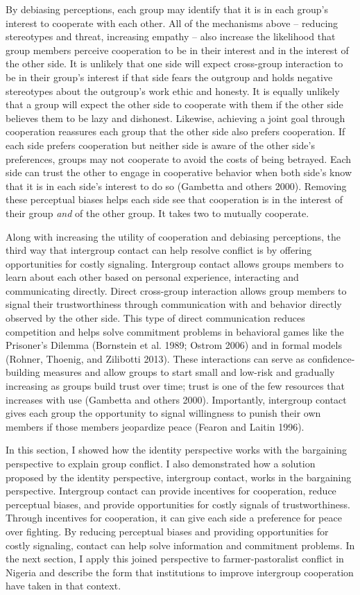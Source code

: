 \documentclass[11pt]{article}
\begin{document}
By debiasing perceptions, each group may identify that it is in each
group's interest to cooperate with each other. All of the mechanisms
above -- reducing stereotypes and threat, increasing empathy -- also
increase the likelihood that group members perceive cooperation to be in
their interest and in the interest of the other side. It is unlikely
that one side will expect cross-group interaction to be in their group's
interest if that side fears the outgroup and holds negative stereotypes
about the outgroup's work ethic and honesty. It is equally unlikely that
a group will expect the other side to cooperate with them if the other
side believes them to be lazy and dishonest. Likewise, achieving a joint
goal through cooperation reassures each group that the other side also
prefers cooperation. If each side prefers cooperation but neither side
is aware of the other side's preferences, groups may not cooperate to
avoid the costs of being betrayed. Each side can trust the other to
engage in cooperative behavior when both side's know that it is in each
side's interest to do so (Gambetta and others 2000). Removing these
perceptual biases helps each side see that cooperation is in the
interest of their group \emph{and} of the other group. It takes two to
mutually cooperate.

Along with increasing the utility of cooperation and debiasing
perceptions, the third way that intergroup contact can help resolve
conflict is by offering opportunities for costly signaling. Intergroup
contact allows groups members to learn about each other based on
personal experience, interacting and communicating directly. Direct
cross-group interaction allows group members to signal their
trustworthiness through communication with and behavior directly
observed by the other side. This type of direct communication reduces
competition and helps solve commitment problems in behavioral games like
the Prisoner's Dilemma (Bornstein et al. 1989; Ostrom 2006) and in
formal models (Rohner, Thoenig, and Zilibotti 2013). These interactions
can serve as confidence-building measures and allow groups to start
small and low-risk and gradually increasing as groups build trust over
time; trust is one of the few resources that increases with use
(Gambetta and others 2000). Importantly, intergroup contact gives each
group the opportunity to signal willingness to punish their own members
if those members jeopardize peace (Fearon and Laitin 1996).

In this section, I showed how the identity perspective works with the
bargaining perspective to explain group conflict. I also demonstrated
how a solution proposed by the identity perspective, intergroup contact,
works in the bargaining perspective. Intergroup contact can provide
incentives for cooperation, reduce perceptual biases, and provide
opportunities for costly signals of trustworthiness. Through incentives
for cooperation, it can give each side a preference for peace over
fighting. By reducing perceptual biases and providing opportunities for
costly signaling, contact can help solve information and commitment
problems. In the next section, I apply this joined perspective to
farmer-pastoralist conflict in Nigeria and describe the form that
institutions to improve intergroup cooperation have taken in that
context.
\end{document}
